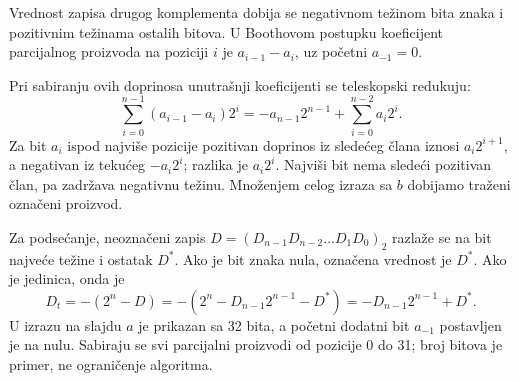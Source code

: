 Vrednost zapisa drugog komplementa dobija se negativnom težinom bita znaka i pozitivnim težinama ostalih bitova. U Boothovom postupku koeficijent parcijalnog proizvoda na poziciji $i$ je $a_{i-1}-a_i$, uz početni $a_{-1}=0$.

Pri sabiranju ovih doprinosa unutrašnji koeficijenti se teleskopski redukuju:
\[\sum_{i=0}^{n-1}(a_{i-1}-a_i)2^i
=-a_{n-1}2^{n-1}+\sum_{i=0}^{n-2}a_i2^i.\]
Za bit $a_i$ ispod najviše pozicije pozitivan doprinos iz sledećeg člana iznosi $a_i2^{i+1}$, a negativan iz tekućeg $-a_i2^i$; razlika je $a_i2^i$. Najviši bit nema sledeći pozitivan član, pa zadržava negativnu težinu. Množenjem celog izraza sa $b$ dobijamo traženi označeni proizvod.

Za podsećanje, neoznačeni zapis $D=(D_{n-1}D_{n-2}\ldots D_1D_0)_2$ razlaže se na bit najveće težine i ostatak $D^*$. Ako je bit znaka nula, označena vrednost je $D^*$. Ako je jedinica, onda je
\[D_t=-(2^n-D)=-(2^n-D_{n-1}2^{n-1}-D^*)=-D_{n-1}2^{n-1}+D^*.\]
U izrazu na slajdu $a$ je prikazan sa 32 bita, a početni dodatni bit $a_{-1}$ postavljen je na nulu. Sabiraju se svi parcijalni proizvodi od pozicije 0 do 31; broj bitova je primer, ne ograničenje algoritma.
